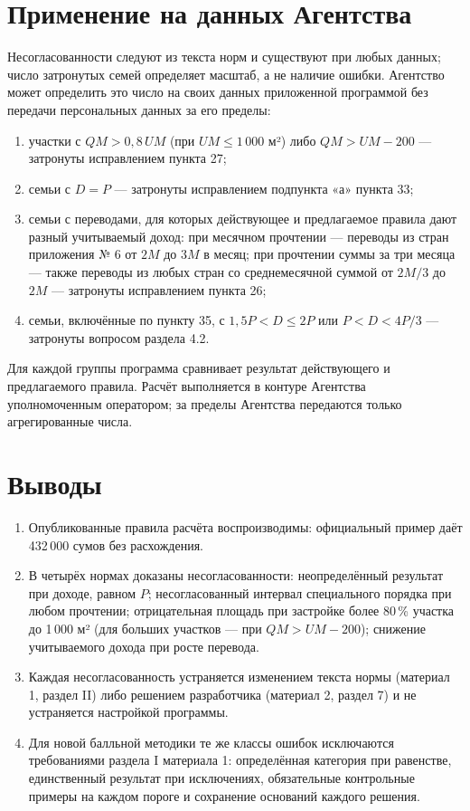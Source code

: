 \documentclass[12pt,a4paper]{extarticle}
\begin{document}
\section{Применение на данных Агентства}\label{sec:agency}
Несогласованности следуют из текста норм и существуют при любых данных; число затронутых семей определяет масштаб, а не наличие ошибки. Агентство может определить это число на своих данных приложенной программой без передачи персональных данных за его пределы:
\begin{enumerate}[leftmargin=1.27cm]
\item участки с $QM>0{,}8\,UM$ (при $UM\le1\,000$ м²) либо $QM>UM-200$ — затронуты исправлением пункта 27;
\item семьи с $D=P$ — затронуты исправлением подпункта «а» пункта 33;
\item семьи с переводами, для которых действующее и предлагаемое правила дают разный учитываемый доход: при месячном прочтении — переводы из стран приложения № 6 от $2M$ до $3M$ в месяц; при прочтении суммы за три месяца — также переводы из любых стран со среднемесячной суммой от $2M/3$ до $2M$ — затронуты исправлением пункта 26;
\item семьи, включённые по пункту 35, с $1{,}5P<D\le2P$ или $P<D<4P/3$ — затронуты вопросом раздела 4.2.
\end{enumerate}
Для каждой группы программа сравнивает результат действующего и предлагаемого правила. Расчёт выполняется в контуре Агентства уполномоченным оператором; за пределы Агентства передаются только агрегированные числа.

\section{Выводы}
\begin{enumerate}[leftmargin=1.27cm]
\item Опубликованные правила расчёта воспроизводимы: официальный пример даёт 432\,000 сумов без расхождения.
\item В четырёх нормах доказаны несогласованности: неопределённый результат при доходе, равном $P$; несогласованный интервал специального порядка при любом прочтении; отрицательная площадь при застройке более 80\,\% участка до 1\,000 м² (для больших участков — при $QM>UM-200$); снижение учитываемого дохода при росте перевода.
\item Каждая несогласованность устраняется изменением текста нормы (материал 1, раздел II) либо решением разработчика (материал 2, раздел 7) и не устраняется настройкой программы.
\item Для новой балльной методики те же классы ошибок исключаются требованиями раздела I материала 1: определённая категория при равенстве, единственный результат при исключениях, обязательные контрольные примеры на каждом пороге и сохранение оснований каждого решения.
\end{enumerate}
\end{document}
